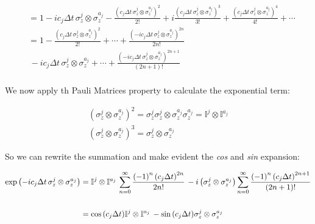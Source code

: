 \documentclass[a4paper,12pt]{article}
\begin{document}
	\begin{align*}
		&= 1 - i c_j \Delta t \, \sigma_{z}^{j} \otimes \sigma_{z}^{a_j} - \frac{\left( c_j \Delta t \, \sigma_{z}^{j} \otimes \sigma_{z}^{a_j} \right)^2}{2!} + i \frac{\left( c_j \Delta t \, \sigma_{z}^{j} \otimes \sigma_{z}^{a_j} \right)^3}{3!} + \frac{\left( c_j \Delta t \, \sigma_{z}^{j} \otimes \sigma_{z}^{a_j} \right)^4}{4!} + \cdots  \\
		&=1 - \frac{\left( c_j \Delta t \, \sigma_{z}^{j} \otimes \sigma_{z}^{a_j} \right)^2}{2!} + \cdots  + \frac{\left( -i c_j \Delta t \, \sigma_{z}^{j} \otimes \sigma_{z}^{a_j} \right)^{{2n}}}{2n!}  \\
		&\,- i c_j\Delta t \, \sigma_{z}^{j} \otimes \sigma_{z}^{a_j} + \cdots  + \frac{\left( -i c_j \Delta t \, \sigma_{z}^{j} \otimes \sigma_{z}^{a_j} \right)^{{2n+1}}}{(2n+1)!} \\
	\end{align*}

	\begin{flushleft}
		We now apply th Pauli Matrices property to calculate the exponential term:
	\end{flushleft}

	\begin{gather}
		\left(\sigma_{z}^{j} \otimes \sigma_{z}^{a_j} \right)^{2} = \sigma_{z}^{j} \sigma_{z}^{j} \otimes \sigma_{z}^{a_j} \sigma_{z}^{a_j} = \mathbb{I}^{j} \otimes \mathbb{I}^{a_j} \\
		\left(\sigma_{z}^{j} \otimes \sigma_{z}^{a_j} \right)^{3} = \sigma_{z}^{j} \otimes \sigma_{z}^{a_j}
		\label{eq:pauli_matrix_prop}
	\end{gather}

	\begin{flushleft}
		So we can rewrite the summation and make evident the \textit{cos} and \textit{sin} expansion:
	\end{flushleft}

	\begin{align}
		\exp{\left( -i c_j \Delta t \, \sigma_{z}^{j} \otimes \sigma_{z}^{a_j} \right)} &=\mathbb{I}^{j} \otimes \mathbb{I}^{a_j} \, \sum_{n=0}^{\infty}
		{ \frac{ \left(-1\right)^{n} \left( c_j \Delta t \right)^{{2n}}}{2n!} } \,  - i \left(\sigma_{z}^{j} \otimes \sigma_{z}^{a_j} \right) \sum_{n=0}^{\infty}{ \frac{ \left(-1\right)^{n} \left( c_j \Delta t  \right)^{{2n+1}}}{(2n+1)!} } \notag \\
		\notag \\
		&= \cos{\left(c_j \Delta t\right)} \mathbb{I}^{j} \otimes \mathbb{I}^{a_j} \, - \sin{\left(c_j \Delta t \right)} \sigma_{z}^{j} \otimes \sigma_{z}^{a_j}
		\label{eq:U_diff_reconstruction}
	\end{align}
\end{document}
